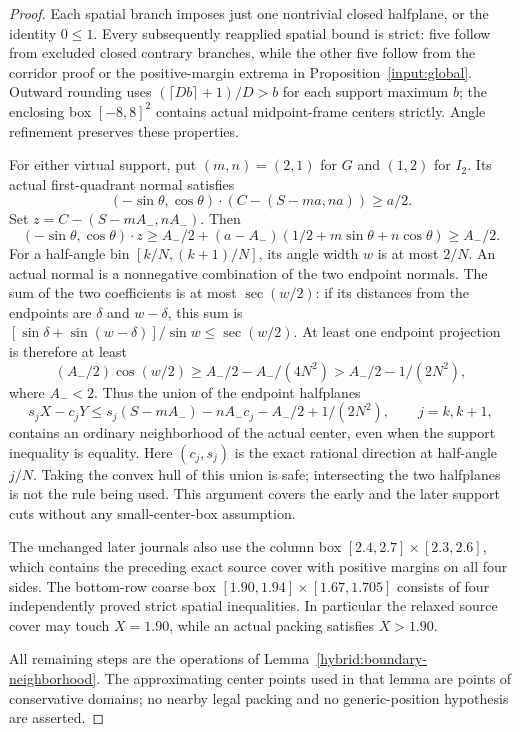 \documentclass[11pt]{article}
\begin{document}
\begin{proof}
Each spatial branch imposes just one nontrivial closed halfplane, or the
identity $0\le1$. Every subsequently reapplied spatial bound is strict:
five follow from excluded closed contrary branches, while the other five
follow from the corridor proof or the positive-margin extrema in
Proposition~\ref{input:global}. Outward
rounding uses $(\lceil D b\rceil+1)/D>b$ for each support maximum $b$;
the enclosing box $[-8,8]^2$ contains actual midpoint-frame centers
strictly. Angle refinement preserves these properties.

For either virtual support, put $(m,n)=(2,1)$ for $G$ and $(1,2)$ for
$I_2$. Its actual first-quadrant normal satisfies
\[
 (-\sin\theta,\cos\theta)\cdot(C-(S-ma,na))\ge a/2.
\]
Set $z=C-(S-mA_-,nA_-)$. Then
\[
 (-\sin\theta,\cos\theta)\cdot z
 \ge A_-/2+(a-A_-)(1/2+m\sin\theta+n\cos\theta)\ge A_-/2.
\]
For a half-angle bin $[k/N,(k+1)/N]$, its angle width $w$ is at most
$2/N$. An actual normal is a nonnegative combination of the two endpoint
normals. The sum of the two coefficients is at most $\sec(w/2)$:
if its distances from the endpoints are $\delta$ and $w-\delta$, this sum
is $[\sin\delta+\sin(w-\delta)]/\sin w\le\sec(w/2)$.
At least one endpoint projection is therefore at least
\[
 (A_-/2)\cos(w/2)\ge A_-/2-A_-/(4N^2)
       >A_-/2-1/(2N^2),
\]
where $A_-<2$. Thus the union of the endpoint halfplanes
\[
 s_jX-c_jY\le s_j(S-mA_-)-nA_-c_j-A_-/2+1/(2N^2),
 \qquad j=k,k+1,
\]
contains an ordinary neighborhood of the actual center, even when the
support inequality is equality. Here $(c_j,s_j)$ is the exact rational
direction at half-angle $j/N$. Taking the convex hull of this union is
safe; intersecting the two halfplanes is not the rule being used.
This argument covers the early and the later support cuts without any
small-center-box assumption.

The unchanged later journals also use the column box
$[2.4,2.7]\times[2.3,2.6]$, which contains the preceding exact source cover with
positive margins on all four sides. The bottom-row coarse box
$[1.90,1.94]\times[1.67,1.705]$ consists of four independently proved
strict spatial inequalities. In particular the relaxed source cover
may touch $X=1.90$, while an actual packing satisfies $X>1.90$.

All remaining steps are the operations of
Lemma~\ref{hybrid:boundary-neighborhood}. The approximating center
points used in that lemma are points of conservative domains; no nearby
legal packing and no generic-position hypothesis are asserted.
\end{proof}
\end{document}
